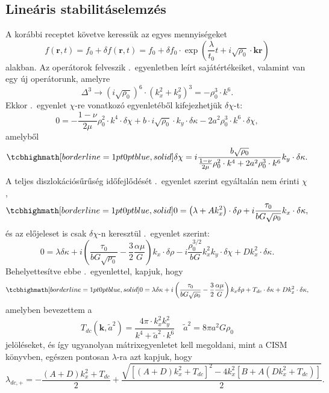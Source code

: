 \documentclass[10pt,a4paper]{scrartcl}
\let\mathbf\bm
\begin{document}
\subsection{Lineáris stabilitáselemzés}
A korábbi receptet követve keressük az egyes mennyiségeket
\[f\left( {{\mathbf{r}},t} \right) = {f_0} + \delta f\left( {{\mathbf{r}},t} \right) = {f_0} + \delta {f_0} \cdot \exp \left( {\frac{\lambda }{{{t_0}}}t + i\sqrt {{\rho _0}}  \cdot {\mathbf{kr}}} \right)\]
alakban. Az operátorok felveszik .\ egyenletben leírt sajátértékeiket, valamint van egy új operátorunk, amelyre
\[{\Delta ^3} \to {\left( {i\sqrt {{\rho _0}} } \right)^6} \cdot {\left( {k_x^2 + k_y^2} \right)^3} =  - \rho _0^3 \cdot {k^6}.\]
Ekkor .\ egyenlet $\chi$-re vonatkozó egyenletéből kifejezhetjük $\delta \chi$-t:
\[
  0  =  - \frac{{1 - \nu }}{{2\mu }}\rho _0^2 \cdot {k^4} \cdot \delta \chi  + b \cdot i\sqrt {{\rho _0}}  \cdot {k_y} \cdot \delta \kappa  - 2{a^2}\rho _0^3 \cdot {k^6} \cdot \delta \chi,\]
amelyből 
\begin{equation} \label{eq:lin_ed_chi_dc}
\tcbhighmath[borderline={1pt}{0pt}{blue,solid}]{
\delta \chi  = i\frac{{b\sqrt {{\rho _0}} }}{{\frac{{1 - \nu }}{{2\mu }}\rho _0^2 \cdot {k^4} + 2{a^2}\rho _0^3 \cdot {k^6}}}{k_y} \cdot \delta \kappa.}
\end{equation}
A teljes diszlokációsűrűség időfejlődését  .\ egyenlet szerint egyáltalán nem érinti $\chi$,
\begin{equation*}
\tcbhighmath[borderline={1pt}{0pt}{blue,solid}]{
0 = \left( {\lambda  + Ak_x^2} \right) \cdot \delta \rho  + i\frac{{{\tau _0}}}{{bG\sqrt {{\rho _0}} }}{k_x} \cdot \delta \kappa, }
\end{equation*}
és az előjeleset is csak $\delta \chi$-n keresztül .\ egyenlet szerint:
\[0 = \lambda \delta \kappa  + i\left( {\frac{{{\tau _0}}}{{bG\sqrt {{\rho _0}} }} - \frac{3}{2}\frac{{\alpha \mu }}{G}} \right){k_x} \cdot \delta \rho  - i\frac{{\rho _0^{3/2}}}{{bG}}k_x^2{k_y} \cdot \delta \chi  + Dk_x^2 \cdot \delta \kappa .\]
Behelyettesítve ebbe .\ egyenlettel, kapjuk, hogy 
\begin{equation} \label{eq:lin_ed_kappa_dc}
\tcbhighmath[borderline={1pt}{0pt}{blue,solid}]{
0 = \lambda \delta \kappa  + i\left( {\frac{{{\tau _0}}}{{bG\sqrt {{\rho _0}} }} - \frac{3}{2}\frac{{\alpha \mu }}{G}} \right){k_x}\delta \rho  + {T_{dc}} \cdot \delta \kappa  + Dk_x^2 \cdot \delta \kappa,}
\end{equation}
amelyben bevezettem a 
\[{T_{dc}}\left( {\mathbf{k}},{\tilde a}^2 \right) = \frac{{4\pi  \cdot k_x^2k_y^2}}{{{k^4} + {{\tilde a}^2} \cdot {k^6}}}\quad {{\tilde a}^2} = 8\pi {a^2}G{\rho _0}\]
jelöléseket, és így ugyanolyan mátrixegyenletet kell megoldani, mint a CISM könyvben, egészen pontosan $\lambda$-ra azt kapjuk, hogy 
\[{\lambda _{dc, + }} =  - \frac{{\left( {A + D} \right)k_x^2 + {T_{dc}}}}{2} + \frac{{\sqrt {{{\left[ {\left( {A + D} \right)k_x^2 + {T_{dc}}} \right]}^2} - 4k_x^2\left[ {B + A\left( {Dk_x^2 + {T_{dc}}} \right)} \right]} }}{2}.\]
\end{document}

